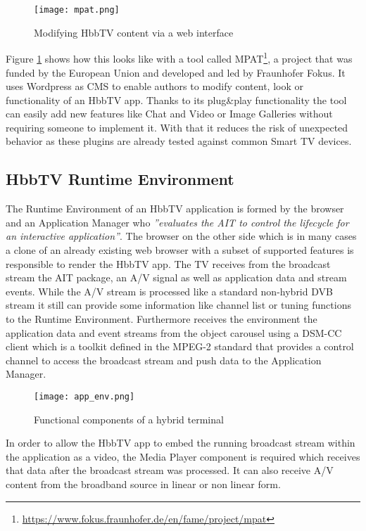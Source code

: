 \begin{figure}[htb]
  \centering
  \texttt{[image: mpat.png]}\\
  \caption{
    Modifying HbbTV content via a web interface
  }
  \label{fig:mpat}
\end{figure}

Figure \ref{fig:mpat} shows how this looks like with a tool called MPAT\footnote{\url{https://www.fokus.fraunhofer.de/en/fame/project/mpat}},
a project that was funded by the European Union and developed and led by Fraunhofer Fokus.
It uses Wordpress as CMS to enable authors to modify content, look or functionality of an HbbTV
app. Thanks to its plug\&play functionality the tool can easily add new features like Chat and Video or
Image Galleries without requiring someone to implement it. With that it reduces the risk of unexpected
behavior as these plugins are already tested against common Smart TV devices.

\subsection{HbbTV Runtime Environment\label{sec:hbbtvruntimeenvironment}}

The Runtime Environment of an HbbTV application is formed by the browser and an Application Manager who
\textit{''evaluates the AIT to control the lifecycle for an interactive application''}\cite{hbbtv15}.
The browser on the other side which is in many cases a clone of an already existing web browser with
a subset of supported features is responsible to render the HbbTV app. The TV receives from the broadcast
stream the AIT package, an A/V signal as well as application data and stream events. While the A/V
stream is processed like a standard non-hybrid DVB stream it still can provide some information like
channel list or tuning functions to the Runtime Environment. Furthermore receives the environment
the application data and event streams from the object carousel using a DSM-CC client which is a
toolkit defined in the MPEG-2 standard that provides a control channel to access the broadcast stream
and push data to the Application Manager.

\begin{figure}[htb]
  \centering
  \texttt{[image: app\_env.png]}\\
  \caption{
    Functional components of a hybrid terminal
  }
  \label{fig:app_env}
\end{figure}

In order to allow the HbbTV app to embed the running broadcast stream within the application
as a video, the Media Player component is required which receives that data after the broadcast
stream was processed. It can also receive A/V content from the broadband source in linear or non
linear form.

